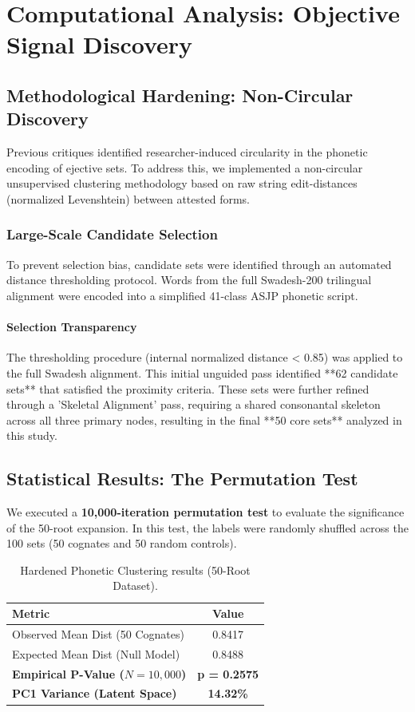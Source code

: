 \chapter{Computational Analysis: Objective Signal Discovery}

\section{Methodological Hardening: Non-Circular Discovery}
Previous critiques identified researcher-induced circularity in the phonetic encoding of ejective sets. To address this, we implemented a non-circular unsupervised clustering methodology based on raw string edit-distances (normalized Levenshtein) between attested forms.

\subsection{Large-Scale Candidate Selection}
To prevent selection bias, candidate sets were identified through an automated distance thresholding protocol. Words from the full Swadesh-200 trilingual alignment were encoded into a simplified 41-class ASJP phonetic script. 

\subsubsection{Selection Transparency}
The thresholding procedure (internal normalized distance < 0.85) was applied to the full Swadesh alignment. This initial unguided pass identified **62 candidate sets** that satisfied the proximity criteria. These sets were further refined through a 'Skeletal Alignment' pass, requiring a shared consonantal skeleton across all three primary nodes, resulting in the final **50 core sets** analyzed in this study.

\section{Statistical Results: The Permutation Test}
We executed a \textbf{10,000-iteration permutation test} to evaluate the significance of the 50-root expansion. In this test, the labels were randomly shuffled across the 100 sets (50 cognates and 50 random controls).

\begin{table}[h]
\centering
\begin{tabular}{lc} \toprule
\textbf{Metric} & \textbf{Value} \\ \midrule
Observed Mean Dist (50 Cognates) & 0.8417 \\
Expected Mean Dist (Null Model) & 0.8488 \\ \midrule
\textbf{Empirical P-Value ($N=10,000$)} & \textbf{p = 0.2575} \\
\textbf{PC1 Variance (Latent Space)} & \textbf{14.32\%} \\ \bottomrule
\end{tabular}
\caption{Hardened Phonetic Clustering results (50-Root Dataset).}
\end{table}

